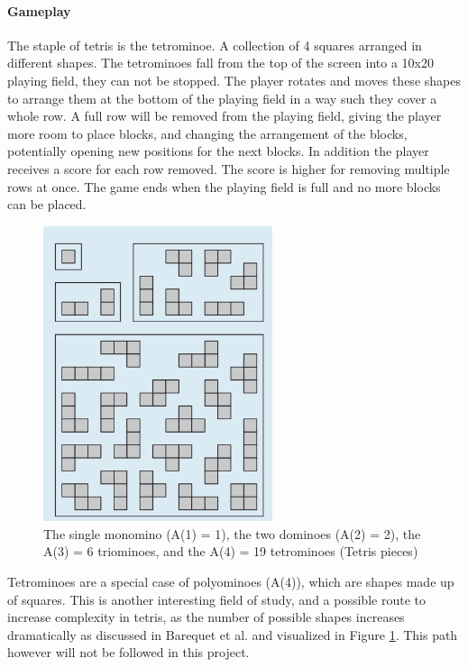 \documentclass{article}
\begin{document}
\paragraph{Gameplay}
The staple of tetris is the tetrominoe. A collection of 4 squares arranged in different shapes. The tetrominoes fall from the top of the screen into a 10x20 playing field, they can not be stopped. The player rotates and moves these shapes to arrange them at the bottom of the playing field in a way such they cover a whole row. A full row will be removed from the playing field, giving the player more room to place blocks, and changing the arrangement of the blocks, potentially opening new positions for the next blocks.
In addition the player receives a score for each row removed. The score is higher for removing multiple rows at once. The game ends when the playing field is full and no more blocks can be placed.
\begin{figure}
    \label{fig:poly}
    \centering
    \includegraphics[width=0.6\textwidth]{polynominoes.png}
    \caption{The single monomino (A(1) = 1),
    the two dominoes (A(2) = 2), the A(3) = 6
    triominoes, and the A(4) = 19 tetrominoes
    (Tetris pieces) \cite{polyominoes}}  
\end{figure}
Tetrominoes are a special case of polyominoes (A(4)), which are shapes made up of squares. This is another interesting field of study, and a possible route to increase complexity in tetris, as the number of possible shapes increases dramatically as discussed in Barequet et al.\cite{polyominoes} and visualized in Figure \ref{fig:poly}.
This path however will not be followed in this project.
\end{document}
